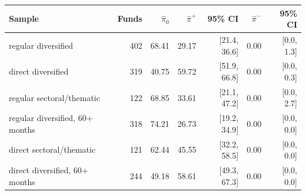 \begin{tabular}{lrrrrrr}
\toprule
Sample & Funds & $\hat\pi_0$ & $\hat\pi^+$ & 95\% CI & $\hat\pi^-$ & 95\% CI \\
\midrule
regular diversified & 402 & 68.41 & 29.17 & [21.4, 36.6] & 0.00 & [0.0, 1.3] \\
direct diversified & 319 & 40.75 & 59.72 & [51.9, 66.8] & 0.00 & [0.0, 0.3] \\
regular sectoral/thematic & 122 & 68.85 & 33.61 & [21.1, 47.2] & 0.00 & [0.0, 2.7] \\
regular diversified, 60+ months & 318 & 74.21 & 26.73 & [19.2, 34.9] & 0.00 & [0.0, 0.0] \\
direct sectoral/thematic & 121 & 62.44 & 45.55 & [32.2, 58.5] & 0.00 & [0.0, 0.0] \\
direct diversified, 60+ months & 244 & 49.18 & 58.61 & [49.3, 67.3] & 0.00 & [0.0, 0.0] \\
\bottomrule
\end{tabular}

